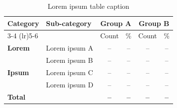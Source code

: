 \begin{table}[htbp]
    \centering
    \caption{Lorem ipsum table caption}
    \small
    \begin{tabular}{@{}l l cc cc@{}}
        \toprule
        \textbf{Category} & \textbf{Sub-category} & \multicolumn{2}{c}{\textbf{Group A}} & \multicolumn{2}{c}{\textbf{Group B}} \\
        \cmidrule(lr){3-4} \cmidrule(lr){5-6}
                          &                       & Count & \%                               & Count & \%                              \\
        \midrule
        \textbf{Lorem}    & Lorem ipsum A         & --    & --                               & --    & --                              \\
                          & Lorem ipsum B         & --    & --                               & --    & --                              \\
        \midrule
        \textbf{Ipsum}    & Lorem ipsum C         & --    & --                               & --    & --                              \\
                          & Lorem ipsum D         & --    & --                               & --    & --                              \\
        \midrule
        \textbf{Total}    &                       & \textbf{--} & \textbf{--}             & \textbf{--} & \textbf{--}             \\
        \bottomrule
    \end{tabular}
    \label{table-root-cause}
\end{table}
